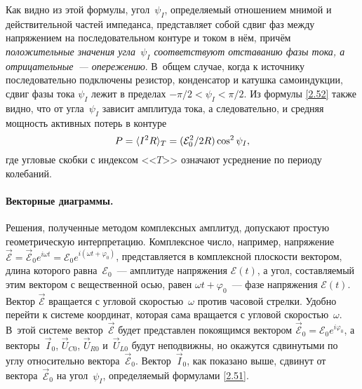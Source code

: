 \documentclass[a4paper,oneside]{book}
\begin{document}
Как видно из этой формулы, угол~$\psi_I$, определяемый отношением мнимой и
действительной частей импеданса, представляет собой сдвиг фаз между напряжением
на последовательном контуре и током в нём, причём \emph{положительные
значения угла~$\psi_I$ соответствуют отставанию фазы тока, а
отрицательные~--- опережению}. В~общем случае, когда к источнику последовательно
подключены резистор, конденсатор и катушка самоиндукции, сдвиг фазы тока
$\psi_I$ лежит в пределах $-\pi/2<\psi_I<\pi/2$. Из формулы \eqref{2.52} также
видно, что от угла~$\psi_I$ зависит амплитуда тока, а следовательно, и средняя
мощность активных потерь в контуре
\begin{equation}\eqmark{2.53}
	P=\langle I^2R\rangle_T=(\mathcal{E}_0^2/2R)\cos^2\psi_I,
\end{equation}
где угловые скобки с индексом <<$T$>> означают усреднение по периоду колебаний.

\paragraph{Векторные диаграммы.}
Решения, полученные методом комплексных амплитуд, допускают простую
геометрическую интерпретацию. Комплексное число, например, напряжение
$\vec{\mathcal{E}}=\vec{\mathcal{E}}_0e^{i\omega t}=\mathcal{E}_0e^{i(\omega
t+\varphi_0)}$, представляется в комплексной плоскости вектором, длина которого
равна~$\mathcal{E}_0$~--- амплитуде напряжения $\mathcal{E}(t)$, а угол,
составляемый этим вектором с вещественной осью, равен $\omega
t+\varphi_0$~--- фазе напряжения $\mathcal{E}(t)$. Вектор $\vec{\mathcal{E}}$
вращается с угловой скоростью~$\omega$ против часовой стрелки. Удобно перейти к
системе координат, которая сама вращается с угловой скоростью~$\omega$. В~этой
системе вектор~$\vec{\mathcal{E}}$ будет представлен покоящимся вектором
$\vec{\mathcal{E}}_0=\mathcal{E}_0e^{i\varphi_0}$, а векторы~$\vec I_0$, $\vec U_{C0}$,
$\vec U_{R0}$ и~$\vec U_{L0}$ будут неподвижны, но окажутся сдвинутыми по углу
относительно вектора~$\vec{\mathcal{E}}_0$. Вектор~$\vec I_0$, как показано выше,
сдвинут от вектора~$\vec{\mathcal{E}}_0$ на угол~$\psi_I$, определяемый формулами
\eqref{2.51}.
\end{document}
